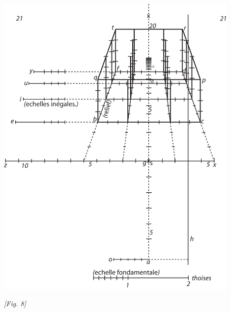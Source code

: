 \begin{center}
\includegraphics[width=0.9\textwidth]{images/T21-Desargues}
\\\rule[-4mm]{0mm}{10mm}\textit{[Fig. 8]}
\end{center}
